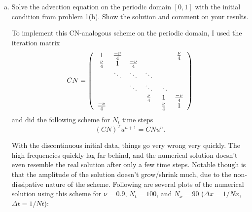\documentclass[12pt]{article}
\begin{document}
\begin{enumerate}[(a)]
\item Solve the advection equation on the periodic domain $[0,1]$ with the initial condition from problem 1(b).  Show the solution and comment on your results.

To implement this CN-analogous scheme on the periodic domain, I used the iteration matrix
$$CN = \qty(\begin{array}{cccccc} 
1 & \frac{-\nu}{4} & & & &  \frac{\nu}{4} \\
\frac{\nu}{4} & 1 & \frac{-\nu}{4} & & & \\
& \ddots & \ddots & \ddots & & \\
& & \ddots & \ddots & \ddots &  \\
& & & \frac{\nu}{4} & 1 & \frac{-\nu}{4} \\
\frac{-\nu}{4} & & & & \frac{\nu}{4} & 1
\end{array}) $$
and did the following scheme for $N_t$ time steps $$(CN)^Tu^{n+1} = CN u^{n}.$$ 

With the discontinuous initial data, things go very wrong very quickly.  The high frequencies quickly lag far behind, and the numerical solution doesn't even resemble the real solution after only a few time steps.  Notable though is that the amplitude of the solution doesn't grow/shrink much, due to the non-dissipative nature of the scheme.  Following are several plots of the numerical solution using this scheme for $\nu=0.9$, $N_t=100$, and $N_x=90$ ($\Delta x = 1/Nx$, $\Delta t=1/Nt$):


\end{enumerate}
\end{document}
